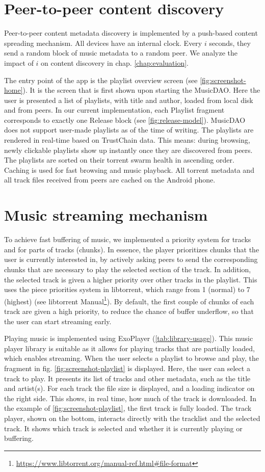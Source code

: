 \section{Peer-to-peer content discovery}
Peer-to-peer content metadata discovery is implemented by a push-based content spreading mechanism. All devices have an internal clock. Every $i$ seconds, they send a random block of music metadata to a random peer. We analyze the impact of $i$ on content discovery in chap. \ref{chap:evaluation}.

The entry point of the app is the playlist overview screen (see \ref{fig:screenshot-home}). It is the screen that is first shown upon starting the MusicDAO. Here the user is presented a list of playlists, with title and author, loaded from local disk and from peers. In our current implementation, each Playlist fragment corresponds to exactly one Release block (see \ref{fig:release-model}). MusicDAO does not support user-made playlists as of the time of writing. The playlists are rendered in real-time based on TrustChain data. This means: during browsing, newly clickable playlists show up instantly once they are discovered from peers. The playlists are sorted on their torrent swarm health in ascending order. Caching is used for fast browsing and music playback. All torrent metadata and all track files received from peers are cached on the Android phone.

\section{Music streaming mechanism}
To achieve fast buffering of music, we implemented a priority system for tracks and for parts of tracks (chunks). In essence, the player prioritizes chunks that the user is currently interested in, by actively asking peers to send the corresponding chunks that are necessary to play the selected section of the track. In addition, the selected track is given a higher priority over other tracks in the playlist. This uses the piece priorities system in libtorrent, which range from 1 (normal) to 7 (highest) (see libtorrent Manual\footnote{\url{https://www.libtorrent.org/manual-ref.html\#file-format}}). By default, the first couple of chunks of each track are given a high priority, to reduce the chance of buffer underflow, so that the user can start streaming early. 

Playing music is implemented using ExoPlayer (\ref{tab:library-usage}). This music player library is suitable as it allows for playing tracks that are partially loaded, which enables streaming. When the user selects a playlist to browse and play, the fragment in fig. \ref{fig:screenshot-playlist} is displayed. Here, the user can select a track to play. It presents its list of tracks and other metadata, such as the title and artist(s). For each track the file size is displayed, and a loading indicator on the right side. This shows, in real time, how much of the track is downloaded. In the example of \ref{fig:screenshot-playlist}, the first track is fully loaded. The track player, shown on the bottom, interacts directly with the tracklist and the selected track. It shows which track is selected and whether it is currently playing or buffering. 

